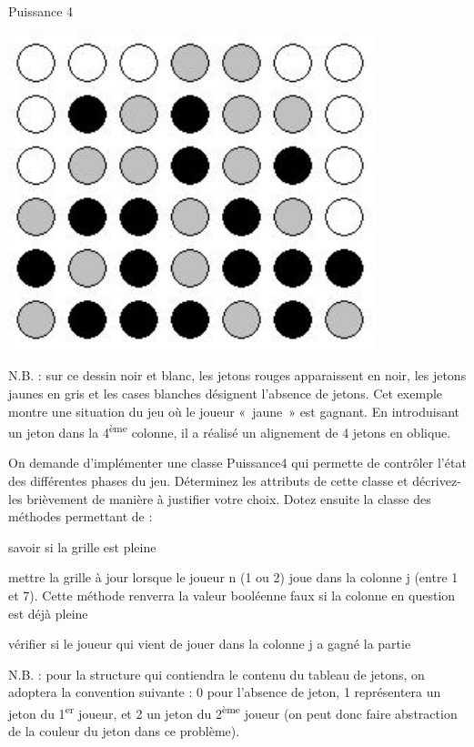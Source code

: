 \begin{Exercice}{Puissance 4}
		\begin{minipage}[t][][b]{4cm}
		\includegraphics[width=0.8\textwidth]{image/puissance4}
		\end{minipage}
		\begin{minipage}[t][][b]{10cm}
		N.B. : sur ce dessin noir et
		blanc, les jetons rouges apparaissent en noir, les jetons jaunes en
		gris et les cases blanches désignent l'absence de
		jetons. Cet exemple montre une situation du jeu où le joueur «~jaune~»
		est gagnant. En introduisant un jeton dans la
		4\textsuperscript{ème} colonne,
		il a réalisé un alignement de 4 jetons en oblique.
		\end{minipage}

	
	On demande d’implémenter une classe Puissance4 qui permette de contrôler
	l’état des différentes phases du jeu. Déterminez les attributs de cette
	classe et décrivez-les brièvement de manière à justifier votre choix.
	Dotez ensuite la classe des méthodes permettant de :

	\begin{liste}
		\item 
			savoir si la grille est pleine
		\item 
			mettre la grille à jour lorsque le joueur n (1 ou 2) joue dans la
			colonne j (entre 1 et 7). Cette méthode renverra la valeur booléenne
			faux si la colonne en question est déjà pleine
		\item 
			vérifier si le joueur qui vient de jouer dans la colonne j a gagné la
			partie
	\end{liste}
	
	N.B. : pour la structure qui contiendra le contenu du tableau de jetons,
	on adoptera la convention suivante : 0 pour l’absence de jeton, 1
	représentera un jeton du 1\textsuperscript{er} joueur, et 2 un jeton du
	2\textsuperscript{ème} joueur (on peut donc faire abstraction de la
	couleur du jeton dans ce problème).
\end{Exercice}


